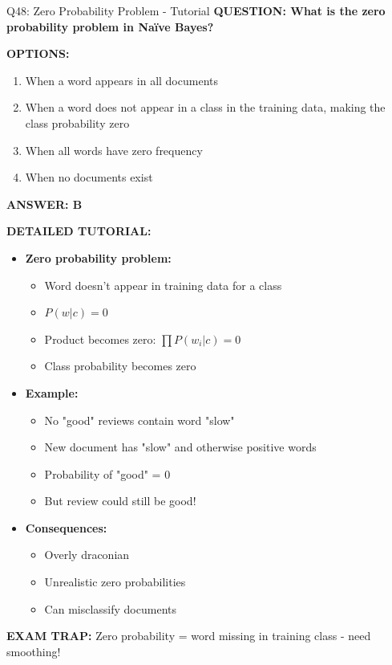 \documentclass[8pt]{beamer}
\begin{document}
	\begin{frame}{Q48: Zero Probability Problem - Tutorial}
		\fontsize{6.5}{7.5}\selectfont
		\textbf{QUESTION: What is the zero probability problem in Naïve Bayes?}
		
		\vspace{0.1cm}
		\textbf{OPTIONS:}
		\begin{enumerate}
			\item When a word appears in all documents
			\item When a word does not appear in a class in the training data, making the class probability zero
			\item When all words have zero frequency
			\item When no documents exist
		\end{enumerate}
		
		\vspace{0.1cm}
		\textcolor{myblue}{\textbf{ANSWER: B}}
		
		\vspace{0.1cm}
		\textbf{DETAILED TUTORIAL:}
		\begin{itemize}
			\item \textbf{Zero probability problem:}
			\begin{itemize}
				\item Word doesn't appear in training data for a class
				\item $P(w|c) = 0$
				\item Product becomes zero: $\prod P(w_i|c) = 0$
				\item Class probability becomes zero
			\end{itemize}
			\item \textbf{Example:}
			\begin{itemize}
				\item No "good" reviews contain word "slow"
				\item New document has "slow" and otherwise positive words
				\item Probability of "good" = 0
				\item But review could still be good!
			\end{itemize}
			\item \textbf{Consequences:}
			\begin{itemize}
				\item Overly draconian
				\item Unrealistic zero probabilities
				\item Can misclassify documents
			\end{itemize}
		\end{itemize}
		
		\textcolor{myred}{\textbf{EXAM TRAP:}} Zero probability = \textcolor{myblue}{word missing in training class} - need smoothing!
	\end{frame}
	
\end{document}
